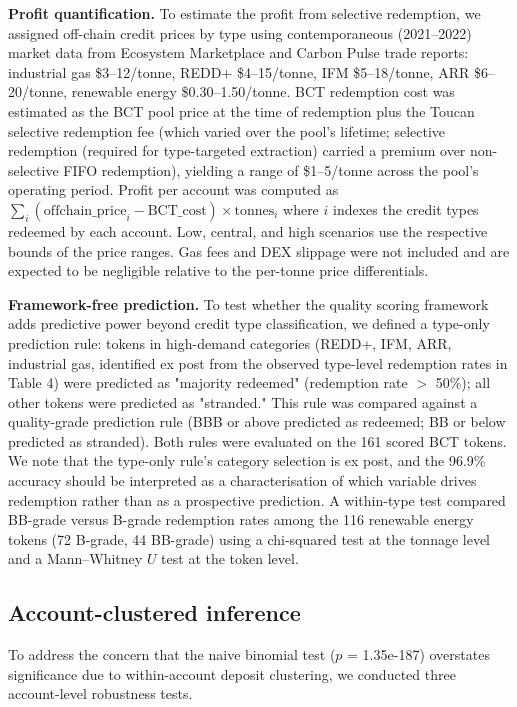 \documentclass[11pt]{article}
\begin{document}
\textbf{Profit quantification.} To estimate the profit from selective redemption, we assigned off-chain credit prices by type using contemporaneous (2021--2022) market data from Ecosystem Marketplace and Carbon Pulse trade reports: industrial gas \$3--12/tonne, REDD+ \$4--15/tonne, IFM \$5--18/tonne, ARR \$6--20/tonne, renewable energy \$0.30--1.50/tonne. BCT redemption cost was estimated as the BCT pool price at the time of redemption plus the Toucan selective redemption fee (which varied over the pool's lifetime; selective redemption (required for type-targeted extraction) carried a premium over non-selective FIFO redemption), yielding a range of \$1--5/tonne across the pool's operating period. Profit per account was computed as $\sum_i (\text{offchain\_price}_i - \text{BCT\_cost}) \times \text{tonnes}_i$ where $i$ indexes the credit types redeemed by each account. Low, central, and high scenarios use the respective bounds of the price ranges. Gas fees and DEX slippage were not included and are expected to be negligible relative to the per-tonne price differentials.

\textbf{Framework-free prediction.} To test whether the quality scoring framework adds predictive power beyond credit type classification, we defined a type-only prediction rule: tokens in high-demand categories (REDD+, IFM, ARR, industrial gas, identified ex post from the observed type-level redemption rates in Table 4) were predicted as "majority redeemed" (redemption rate $>$ 50\%); all other tokens were predicted as "stranded." This rule was compared against a quality-grade prediction rule (BBB or above predicted as redeemed; BB or below predicted as stranded). Both rules were evaluated on the 161 scored BCT tokens. We note that the type-only rule's category selection is ex post, and the 96.9\% accuracy should be interpreted as a characterisation of which variable drives redemption rather than as a prospective prediction. A within-type test compared BB-grade versus B-grade redemption rates among the 116 renewable energy tokens (72 B-grade, 44 BB-grade) using a chi-squared test at the tonnage level and a Mann--Whitney $U$ test at the token level.

\subsection*{Account-clustered inference}

To address the concern that the naive binomial test ($p$ = 1.35e-187) overstates significance due to within-account deposit clustering, we conducted three account-level robustness tests.
\end{document}
